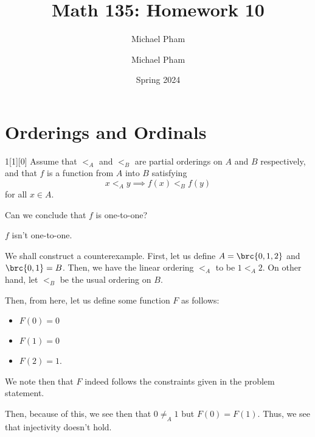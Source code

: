 \documentclass{article}
\title{#1}
\author{Michael Pham}
\date{#2}
\renewcommand{\mytitle}[2]{%
	\title{#1}
	\author{Michael Pham}
	\date{#2}
	\maketitle
	\newpage
	\listoftheorems
	\newpage
}
\begin{document}
\mytitle{Math 135: Homework 10}{Spring 2024}

\setcounter{section}{6}
\section{Orderings and Ordinals}
\begin{hw}{1}[1][0]
	Assume that $<_A$ and $<_B$ are partial orderings on $A$ and $B$ respectively, and that $f$ is a function from $A$ into $B$ satisfying
	\begin{equation*}
		x <_A y \implies f(x) <_B f(y)
	\end{equation*}
	for all $x \in A$. 
	
	Can we conclude that $f$ is one-to-one?
\end{hw}
\begin{solution}
	$f$ isn't one-to-one.
	
	We shall construct a counterexample. First, let us define $A = \brc{0, 1, 2}$ and $\brc{0, 1} = B$. Then, we have the linear ordering $<_A$ to be $1 <_A 2$. On other hand, let $<_B$ be the usual ordering on $B$.
	
	Then, from here, let us define some function $F$ as follows:
	\begin{itemize}
		\item $F(0) = 0$
		\item $F(1) = 0$
		\item $F(2) = 1$.
	\end{itemize}

	We note then that $F$ indeed follows the constraints given in the problem statement.
	
	Then, because of this, we see then that $0 \neq_A 1$ but $F(0) = F(1)$. Thus, we see that injectivity doesn't hold.
\end{solution}
\end{document}

